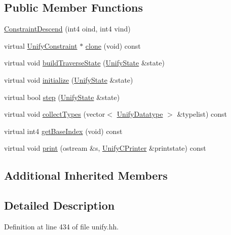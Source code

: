 \subsection*{Public Member Functions}
\begin{DoxyCompactItemize}
\item 
\mbox{\hyperlink{class_constraint_descend_a6698de6b07d6a1134f180d95204c3e2a}{Constraint\+Descend}} (int4 oind, int4 vind)
\item 
virtual \mbox{\hyperlink{class_unify_constraint}{Unify\+Constraint}} $\ast$ \mbox{\hyperlink{class_constraint_descend_aca4b2033e9d1324fc4b01e76019698c8}{clone}} (void) const
\item 
virtual void \mbox{\hyperlink{class_constraint_descend_a33fc5eaf61c61ab08d27dffe051dd2e6}{build\+Traverse\+State}} (\mbox{\hyperlink{class_unify_state}{Unify\+State}} \&state)
\item 
virtual void \mbox{\hyperlink{class_constraint_descend_aaf9c2b3a92648d9d13295791ade0afad}{initialize}} (\mbox{\hyperlink{class_unify_state}{Unify\+State}} \&state)
\item 
virtual bool \mbox{\hyperlink{class_constraint_descend_aa5b4c0fb09d4231c8ac20e95cfbaaae4}{step}} (\mbox{\hyperlink{class_unify_state}{Unify\+State}} \&state)
\item 
virtual void \mbox{\hyperlink{class_constraint_descend_a6c98fbd098e48ff4dc789522230612ce}{collect\+Types}} (vector$<$ \mbox{\hyperlink{class_unify_datatype}{Unify\+Datatype}} $>$ \&typelist) const
\item 
virtual int4 \mbox{\hyperlink{class_constraint_descend_ac1d8e7071688fed4a52ef6aace039344}{get\+Base\+Index}} (void) const
\item 
virtual void \mbox{\hyperlink{class_constraint_descend_af1530c37872173f7dfd608964c793a01}{print}} (ostream \&s, \mbox{\hyperlink{class_unify_c_printer}{Unify\+C\+Printer}} \&printstate) const
\end{DoxyCompactItemize}
\subsection*{Additional Inherited Members}


\subsection{Detailed Description}


Definition at line 434 of file unify.\+hh.



